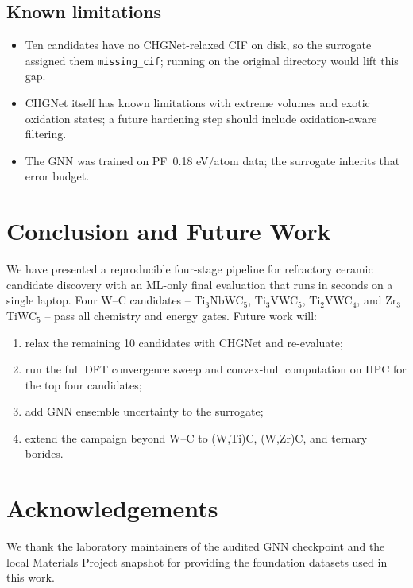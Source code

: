 \documentclass[11pt,a4paper]{article}
\begin{document}
\subsection{Known limitations}
\begin{itemize}[noitemsep]
  \item Ten candidates have no CHGNet-relaxed CIF on disk, so the
        surrogate assigned them \texttt{missing\_cif}; running
         on the original
         directory would lift this gap.
  \item CHGNet itself has known limitations with extreme volumes and
        exotic oxidation states; a future hardening step should
        include oxidation-aware filtering.
  \item The GNN was trained on PF~0.18 eV/atom data; the surrogate
        inherits that error budget.
\end{itemize}

\section{Conclusion and Future Work}
\label{sec:conclusion}

We have presented a reproducible four-stage pipeline for refractory
ceramic candidate discovery with an ML-only final evaluation that
runs in seconds on a single laptop. Four W--C candidates --
Ti$_3$NbWC$_5$, Ti$_3$VWC$_5$, Ti$_2$VWC$_4$, and Zr$_3$TiWC$_5$
-- pass all chemistry and energy gates. Future work will:
\begin{enumerate}[noitemsep]
  \item relax the remaining 10 candidates with CHGNet and re-evaluate;
  \item run the full DFT convergence sweep and convex-hull
        computation on HPC for the top four candidates;
  \item add GNN ensemble uncertainty to the surrogate;
  \item extend the campaign beyond W--C to (W,Ti)C, (W,Zr)C, and
        ternary borides.
\end{enumerate}

\section*{Acknowledgements}
We thank the laboratory maintainers of the audited GNN checkpoint and
the local Materials Project snapshot for providing the foundation
datasets used in this work.
\end{document}
